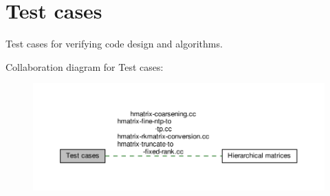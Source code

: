 \hypertarget{group__testers}{}\section{Test cases}
\label{group__testers}


Test cases for verifying code design and algorithms.  


Collaboration diagram for Test cases\+:\nopagebreak
\begin{figure}[H]
\begin{center}
\leavevmode
\includegraphics[width=350pt]{group__testers}
\end{center}
\end{figure}

